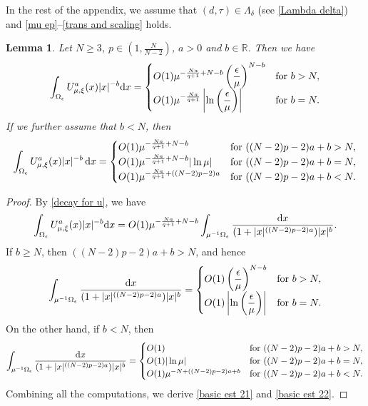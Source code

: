 \documentclass[reqno]{amsart}
\newtheorem{lemma}[theorem]{Lemma}
\theoremstyle{remark}
\newcommand{\ep}{\epsilon}
\newcommand{\dx}{\textup{d}x}
\newcommand{\mx}{{\mu,\xi}}
\renewcommand{\(}{\left(}
\renewcommand{\)}{\right)}
\numberwithin{equation}{section}
\begin{document}
In the rest of the appendix, we assume that $(d,\tau) \in \Lambda_\delta$ (see \eqref{Lambda delta}) and \eqref{mu ep}--\eqref{trans and scaling} holds.
\begin{lemma}\label{basic est 2}
Let $N \ge 3$, $p \in (1,\frac{N}{N-2})$, $a>0$ and $b \in \mathbb{R}$. Then we have
\begin{equation}\label{basic est 21}
\int_{\Omega_\ep} U_\mx^a(x) |x|^{-b} \dx = \begin{cases}
O(1)\mu^{-\frac{Na}{q+1}+N-b}\(\dfrac{\ep}{\mu}\)^{N-b} &\textup{for } b>N,\\
O(1)\mu^{-\frac{Na}{q+1}} \left|\ln\(\dfrac{\ep}{\mu}\)\right| &\textup{for } b=N.
\end{cases}
\end{equation}
If we further assume that $b < N$, then
\begin{equation}\label{basic est 22}
\int_{\Omega_\ep} U_\mx^a(x) |x|^{-b}\, \dx=\begin{cases}
O(1) \mu^{-\frac{Na}{q+1}+N-b} &\textup{for } ((N-2)p-2)a+b>N,\\
O(1) \mu^{-\frac{Na}{q+1}+N-b}|\ln \mu|&\textup{for } ((N-2)p-2)a+b=N,\\
O(1) \mu^{-\frac{Na}{q+1}+((N-2)p-2)a} &\textup{for } ((N-2)p-2)a+b<N.
\end{cases}
\end{equation}
\end{lemma}
\begin{proof}
By \eqref{decay for u}, we have
\[\int_{\Omega_\ep} U_\mx^a(x) |x|^{-b} \dx %
=O(1)\mu^{-\frac{Na}{q+1}+N-b} \int_{\mu^{-1}\Omega_\ep} \frac{\dx}{(1+|x|^{((N-2)p-2)a})|x|^b}.\]
If $b\ge N$, then $((N-2)p-2)a+b>N$, and hence
$$
\int_{\mu^{-1}\Omega_\ep}\frac{\dx}{(1+|x|^{((N-2)p-2)a})|x|^b} = \begin{cases}
O(1) \(\dfrac{\ep}{\mu}\)^{N-b} &\textup{for } b>N,\\
O(1) \left|\ln\(\dfrac{\ep}{\mu}\)\right| &\textup{for } b=N.
\end{cases}
$$
On the other hand, if $ b<N$, then
$$
\int_{\mu^{-1}\Omega_\ep}\frac{\dx}{(1+|x|^{((N-2)p-2)a})|x|^b} = \begin{cases}
O(1) &\textup{for } ((N-2)p-2)a+b>N,\\
O(1) |\ln \mu| &\textup{for } ((N-2)p-2)a+b=N,\\
O(1) \mu^{-N+((N-2)p-2)a+b} &\textup{for } ((N-2)p-2)a+b<N.
\end{cases}
$$
Combining all the computations, we derive \eqref{basic est 21} and \eqref{basic est 22}.
\end{proof}
\end{document}
